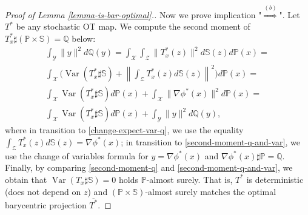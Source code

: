 \documentclass{article} %
\DeclareMathOperator{\Var}{Var}
\begin{document}
\begin{proof}[Proof of Lemma \ref{lemma-is-bar-optimal}.]
Now we prove implication "$\stackrel{(b)}{\Longrightarrow}$". Let  $T^{*}$ be any stochastic OT map. We compute the second moment of $T_{x}^{*}\sharp(\mathbb{P}\times\mathbb{S})=\mathbb{Q}$ below:
\begin{eqnarray}
    \int_{\mathcal{Y}}\|y\|^{2}d\mathbb{Q}(y)=\int_{\mathcal{X}}\int_{\mathcal{Z}}\|T_{x}^{*}(z)\|^{2}d\mathbb{S}(z)d\mathbb{P}(x)=
    \label{second-moment-q}
    \\
    \int_{\mathcal{X}}\bigg(\Var(T^{*}_{x}\sharp\mathbb{S})+\left\|\int_{\mathcal{Z}}T^{*}_{x}(z)d\mathbb{S}(z)\right\|^{2}\bigg)d\mathbb{P}(x)=
    \nonumber
    \\
    \int_{\mathcal{X}}\Var(T^{*}_{x}\sharp\mathbb{S})d\mathbb{P}(x)+\int_{\mathcal{X}}\|\nabla\phi^{*}(x)\|^{2}d\mathbb{P}(x)=
    \label{change-expect-var-q}
    \\
    \int_{\mathcal{X}}\Var(T^{*}_{x}\sharp\mathbb{S})d\mathbb{P}(x)+\int_{\mathcal{Y}}\|y\|^{2}d\mathbb{Q}(y),
    \label{second-moment-q-and-var}
\end{eqnarray}
where in transition to \eqref{change-expect-var-q}, we use the equality $\int_{\mathcal{Z}}T^{*}_{x}(z)d\mathbb{S}(z)=\nabla\phi^{*}(x)$; in transition to \eqref{second-moment-q-and-var}, we use the change of variables formula for $y=\nabla\phi^{*}(x)$ and $\nabla\phi^{*}(x)\sharp\mathbb{P}=\mathbb{Q}$. Finally, by comparing \eqref{second-moment-q} and \eqref{second-moment-q-and-var}, we obtain that $\Var(T_{x}\sharp\mathbb{S})=0$ holds $\mathbb{P}$-almost surely. That is, $T^{*}$ is deterministic (does not depend on $z$) and  $(\mathbb{P}\!\times\!\mathbb{S})$-almost surely matches the optimal barycentric projection $\overline{T^{*}}$.
\end{proof}
\end{document}
